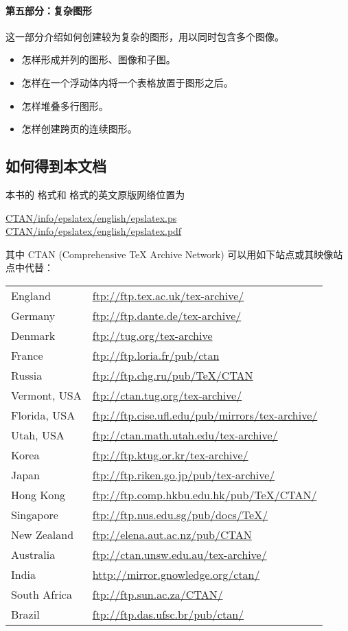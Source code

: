 \paragraph{第五部分：复杂图形}
这一部分介绍如何创建较为复杂的图形，用以同时包含多个图像。
\begin{itemize}
	\item 怎样形成并列的图形、图像和子图。
	\item 怎样在一个浮动体内将一个表格放置于图形之后。
	\item 怎样堆叠多行图形。
	\item 怎样创建跨页的连续图形。
\end{itemize}

\subsection*{如何得到本文档}
本书的 格式和 格式的英文原版网络位置为
\begin{center}
	\href{ftp://ctan.tug.org/tex-archive/info/epslatex/english/epslatex.ps}{CTAN/info/epslatex/english/epslatex.ps}\\
	\href{ftp://ctan.tug.org/tex-archive/info/epslatex/english/epslatex.pdf}{CTAN/info/epslatex/english/epslatex.pdf}
\end{center}
其中 CTAN (Comprehensive \TeX{} Archive Network) 可以用如下站点或其映像站点中代替：
\begin{center}\label{ctan-sites}
	\begin{tabular}{ll}
	England & \url{ftp://ftp.tex.ac.uk/tex-archive/} \\
	Germany & \url{ftp://ftp.dante.de/tex-archive/} \\
	Denmark & \url{ftp://tug.org/tex-archive} \\
	France & \url{ftp://ftp.loria.fr/pub/ctan} \\
	Russia & \url{ftp://ftp.chg.ru/pub/TeX/CTAN} \\
	Vermont, USA & \url{ftp://ctan.tug.org/tex-archive/} \\
	Florida, USA & \url{ftp://ftp.cise.ufl.edu/pub/mirrors/tex-archive/} \\
	Utah, USA & \url{ftp://ctan.math.utah.edu/tex-archive/} \\
	Korea & \url{ftp://ftp.ktug.or.kr/tex-archive/} \\
	Japan & \url{ftp://ftp.riken.go.jp/pub/tex-archive/} \\
	Hong Kong & \url{ftp://ftp.comp.hkbu.edu.hk/pub/TeX/CTAN/} \\
	Singapore & \url{ftp://ftp.nus.edu.sg/pub/docs/TeX/} \\
	New Zealand & \url{ftp://elena.aut.ac.nz/pub/CTAN} \\
	Australia & \url{ftp://ctan.unsw.edu.au/tex-archive/} \\
	India & \url{http://mirror.gnowledge.org/ctan/} \\
	South Africa & \url{ftp://ftp.sun.ac.za/CTAN/} \\
	Brazil & \url{ftp://ftp.das.ufsc.br/pub/ctan/}
	\end{tabular}
\end{center}
